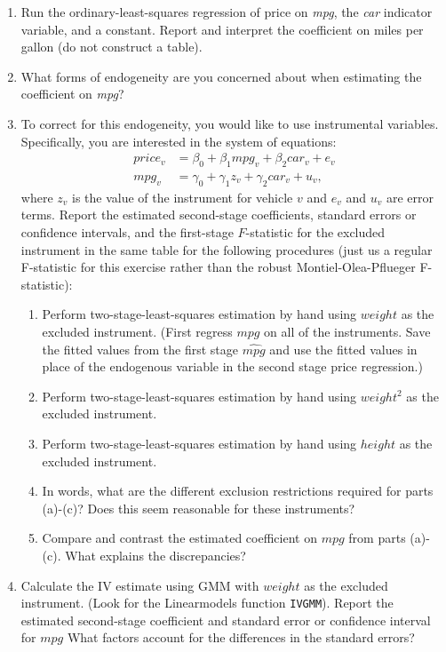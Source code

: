 \documentclass{article}
\begin{document}
\begin{enumerate}
    \item Run the ordinary-least-squares regression of price on \textit{mpg}, the \textit{car} indicator variable, and a constant.  Report and interpret the coefficient on miles per gallon (do not construct a table).
    \item What forms of endogeneity are you concerned about when estimating the coefficient on \textit{mpg}?
    \item To correct for this endogeneity, you would like to use instrumental variables.  Specifically, you are interested in the system of equations:
    \begin{align}
        price_v &= \beta_0 + \beta_1 mpg_v + \beta_2 car_v + e_v \\
        mpg_v &= \gamma_0 + \gamma_1 z_v +\gamma_2 car_v + u_v,
    \end{align}
    where $z_v$ is the value of the instrument for vehicle $v$ and $e_v$ and $u_v$ are error terms.  Report the estimated second-stage coefficients, standard errors or confidence intervals, and the first-stage $F$-statistic for the excluded instrument in the same table for the following procedures (just us a regular F-statistic for this exercise rather than the robust Montiel-Olea-Pflueger F-statistic):
    \begin{enumerate} [label=(\alph*)]
        \item Perform two-stage-least-squares estimation by hand using $weight$ as the excluded instrument.  (First regress $mpg$ on all of the instruments.  Save the fitted values from the first stage $\hat{mpg}$ and use the fitted values in place of the endogenous variable in the second stage price regression.)  
        \item Perform two-stage-least-squares estimation by hand using $weight^2$ as the excluded instrument.
        \item Perform two-stage-least-squares estimation by hand using $height$ as the excluded instrument.
        \item In words, what are the different exclusion restrictions required for parts (a)-(c)?  Does this seem reasonable for these instruments?
        \item Compare and contrast the estimated coefficient on $mpg$ from parts (a)-(c).  What explains the discrepancies?
    \end{enumerate}
    \item Calculate the IV estimate using GMM with $weight$ as the excluded instrument. (Look for the Linearmodels function \verb!IVGMM!).  Report the estimated second-stage coefficient and standard error or confidence interval for $mpg$  What factors account for the differences in the standard errors?
\end{enumerate}
\end{document}

